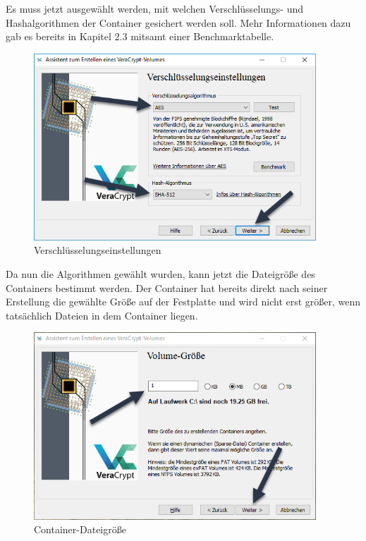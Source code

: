 \documentclass[12pt,a4paper]{scrreprt}
\begin{document}
\newpage

\noindent Es muss jetzt ausgewählt werden, mit welchen Verschlüsselungs- und Hashalgorithmen der Container gesichert werden soll. Mehr Informationen dazu gab es bereits in Kapitel 2.3 mitsamt einer Benchmarktabelle.

\begin{figure}[h]
\begin{center}
\includegraphics[width=300pt]{media/encryptionsettings.png}
\caption{Verschlüsselungseinstellungen}
\label{encryptionsettings}
\end{center}
\end{figure}

\noindent Da nun die Algorithmen gewählt wurden, kann jetzt die Dateigröße des Containers bestimmt werden. Der Container hat bereits direkt nach seiner Erstellung die gewählte Größe auf der Festplatte und wird nicht erst größer, wenn tatsächlich Dateien in dem Container liegen.

\begin{figure}[h]
\begin{center}
\includegraphics[width=300pt]{media/volumesize.png}
\caption{Container-Dateigröße}
\label{containersize}
\end{center}
\end{figure}
\end{document}

